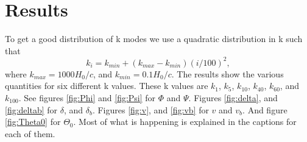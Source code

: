 \documentclass[a4paper]{report}
\begin{document}
\section{Results}\label{sec:results}
To get a good distribution of k modes we use a quadratic distribution in k such that
\begin{equation}
 k_i = k_{min} +(k_{max}-k_{min})(i/100)^2,
\end{equation}
where $k_{max} = 1000H_0/c$, and $k_{min} = 0.1H_0/c$.
The results show the various quantities for six different k values. These k values are $k_1$, $k_5$, $k_{10}$, $k_{40}$, $k_{60}$, and $k_{100}$. See figures \ref{fig:Phi} and \ref{fig:Psi} for $\Phi$ and $\Psi$. Figures \ref{fig:delta}, and \ref{fig:deltab} for $\delta$, and $\delta_b$. Figures \ref{fig:v}, and \ref{fig:vb} for $v$ and $v_b$. And figure \ref{fig:Theta0} for $\Theta_0$. Most of what is happening is explained in the captions for each of them.
\end{document}
